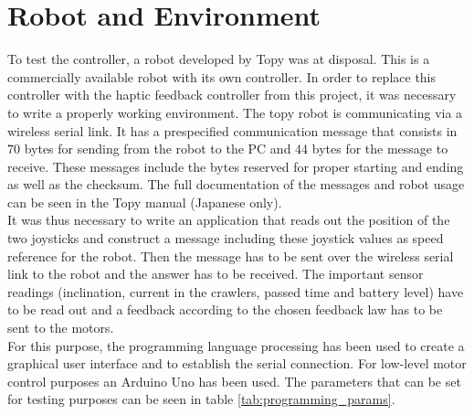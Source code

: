 \section{Robot and Environment}
To test the controller, a robot developed by Topy was at disposal. This is a commercially available robot with its own controller. In order to replace this controller with the haptic feedback controller from this project, it was necessary to write a properly working environment. The topy robot is communicating via a wireless serial link. It has a prespecified communication message that consists in $70$ bytes for sending from the robot to the PC and $44$ bytes for the message to receive. These messages include the bytes reserved for proper starting and ending as well as the checksum. The full documentation of the messages and robot usage can be seen in the Topy manual (Japanese only). \\
It was thus necessary to write an application that reads out the position of the two joysticks and construct a message including these joystick values as speed reference for the robot. Then the message has to be sent over the wireless serial link to the robot and the answer has to be received. The important sensor readings (inclination, current in the crawlers, passed time and battery level) have to be read out and a feedback according to the chosen feedback law has to be sent to the motors.\\
For this purpose, the programming language processing \cite{Fry2018} has been used to create a graphical user interface and to establish the serial connection. For low-level motor control purposes an Arduino Uno has been used. The parameters that can be set for testing purposes can be seen in table \ref{tab:programming_params}.
	

